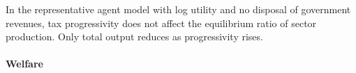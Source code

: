 \begin{prop}
	In the representative agent model with log utility and no disposal of government revenues, tax progressivity does not affect the equilibrium ratio of sector production. Only total output reduces as progressivity rises. 
\end{prop}

\paragraph{Welfare}